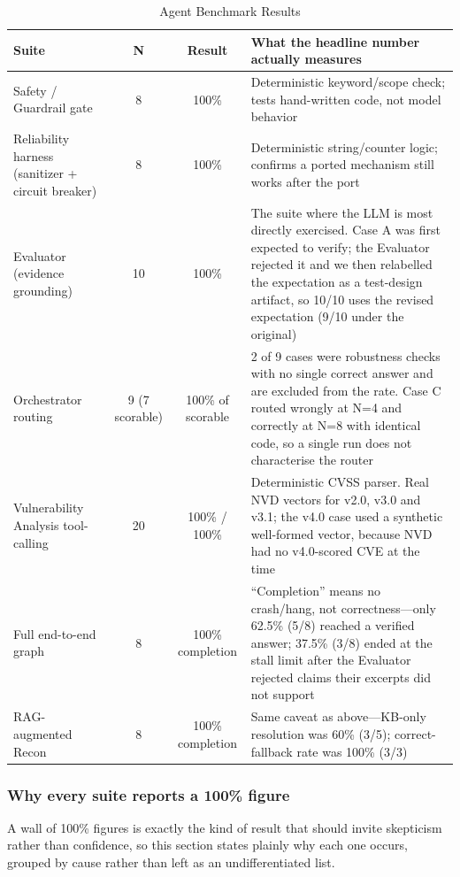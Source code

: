 \documentclass[conference]{IEEEtran}
\begin{document}
\begin{table}[t]
\caption{Agent Benchmark Results}
\label{tab:results}
\centering
\begin{tabular}{@{}lccp{7.6cm}@{}}
\toprule
\textbf{Suite} & \textbf{N} & \textbf{Result} & \textbf{What the headline number actually measures} \\
\midrule
Safety / Guardrail gate & 8 & 100\% & Deterministic keyword/scope check; tests hand-written code, not model behavior \\
Reliability harness (sanitizer + circuit breaker) & 8 & 100\% & Deterministic string/counter logic; confirms a ported mechanism still works after the port \\
Evaluator (evidence grounding) & 10 & 100\% & The suite where the LLM is most directly exercised. Case A was first expected to verify; the Evaluator rejected it and we then relabelled the expectation as a test-design artifact, so 10/10 uses the revised expectation (9/10 under the original) \\
Orchestrator routing & 9 (7 scorable) & 100\% of scorable & 2 of 9 cases were robustness checks with no single correct answer and are excluded from the rate. Case C routed wrongly at N=4 and correctly at N=8 with identical code, so a single run does not characterise the router \\
Vulnerability Analysis tool-calling & 20 & 100\% / 100\% & Deterministic CVSS parser. Real NVD vectors for v2.0, v3.0 and v3.1; the v4.0 case used a synthetic well-formed vector, because NVD had no v4.0-scored CVE at the time \\
Full end-to-end graph & 8 & 100\% completion & ``Completion'' means no crash/hang, not correctness---only 62.5\% (5/8) reached a verified answer; 37.5\% (3/8) ended at the stall limit after the Evaluator rejected claims their excerpts did not support \\
RAG-augmented Recon & 8 & 100\% completion & Same caveat as above---KB-only resolution was 60\% (3/5); correct-fallback rate was 100\% (3/3) \\
\bottomrule
\end{tabular}
\end{table}

\subsubsection{Why every suite reports a 100\% figure}
\label{sec:hundred-percent}

A wall of 100\% figures is exactly the kind of result that should invite
skepticism rather than confidence, so this section states plainly why each
one occurs, grouped by cause rather than left as an undifferentiated list.
\end{document}
